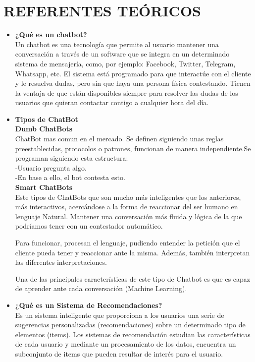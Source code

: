 \documentclass[12pt,letterpaper]{article}
\begin{document}
\section{REFERENTES TEÓRICOS}
\begin{itemize}
	\item \textbf{¿Qué es un chatbot?} \\ 
Un chatbot es una tecnología que permite al usuario mantener una conversación a través de un software que se integra en un determinado sistema de mensajería, como, por ejemplo: Facebook, Twitter, Telegram, Whatsapp, etc. El sistema está programado para que interactúe con el cliente y le resuelva dudas, pero sin que haya una persona física contestando. Tienen la ventaja de que están disponibles siempre para resolver las dudas de los usuarios que quieran contactar contigo a cualquier hora del día.

	\item \textbf{Tipos de ChatBot}\\
	\textbf{Dumb ChatBots}\\ 
ChatBot mas comun en el mercado. Se definen siguiendo unas reglas preestablecidas, protocolos o patrones, funcionan de manera independiente.Se programan siguiendo esta estructura:
\\
-Usuario pregunta algo.\\
-En base a ello, el bot contesta esto.\\


	\textbf{Smart ChatBots}\\
Este tipos de ChatBots que son mucho más inteligentes que los anteriores, más interactivos, acercándose a la forma de reaccionar del ser humano en lenguaje Natural. Mantener una conversación más fluida y lógica de la que podríamos tener con un contestador automático.

Para funcionar, procesan el lenguaje, pudiendo entender la petición que el cliente pueda tener y reaccionar ante la misma. Además, también interpretan las diferentes interpretaciones.

Una de las principales características de este tipo de Chatbot es que es capaz de aprender ante cada conversación (Machine Learning).


	\item  \textbf{¿Qué es un Sistema de Recomendaciones?} \\
Es un sistema inteligente que proporciona a los usuarios una serie de sugerencias personalizadas (recomendaciones) sobre un determinado tipo de elementos (items). Los sistemas de recomendación estudian las características de cada usuario y mediante un procesamiento de los datos, encuentra un subconjunto de items que pueden resultar de interés para el usuario.


\end{itemize}
\end{document}
